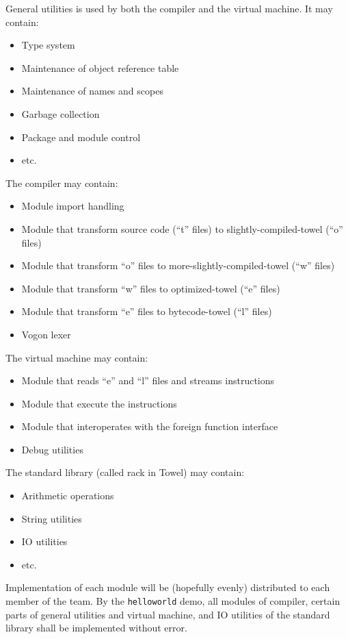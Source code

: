 \documentclass{article}
\begin{document}
General utilities is used by both the compiler and the virtual machine. It may contain:

\begin{itemize}
\item Type system
\item Maintenance of object reference table
\item Maintenance of names and scopes
\item Garbage collection
\item Package and module control
\item etc.
\end{itemize}

The compiler may contain:

\begin{itemize}
\item Module import handling
\item Module that transform source code (``t'' files) to slightly-compiled-towel (``o'' files)
\item Module that transform ``o'' files to more-slightly-compiled-towel (``w'' files)
\item Module that transform ``w'' files to optimized-towel (``e'' files)
\item Module that transform ``e'' files to bytecode-towel (``l'' files)
\item Vogon lexer
\end{itemize}

The virtual machine may contain:

\begin{itemize}
\item Module that reads ``e'' and ``l'' files and streams instructions
\item Module that execute the instructions
\item Module that interoperates with the foreign function interface
\item Debug utilities
\end{itemize}

The standard library (called rack in Towel) may contain:

\begin{itemize}
\item Arithmetic operations
\item String utilities
\item IO utilities
\item etc.
\end{itemize}

Implementation of each module will be (hopefully evenly) distributed to each member of the team. By the \texttt{helloworld} demo, all modules of compiler,
certain parts of general utilities and virtual machine, and IO utilities of the standard library shall be implemented without error.
\end{document}
